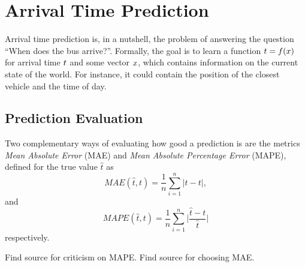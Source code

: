 \section{Arrival Time Prediction}
Arrival time prediction is, in a nutshell, the problem of answering
the question ``When does the bus arrive?''. Formally, the goal is to
learn a function $t = f(x)$ for arrival time $t$ and 
some vector $x$, which
contains information on the current state of the world. For instance, it
could contain the position of the closest vehicle and the time of day.

\subsection{Prediction Evaluation}
Two complementary ways of evaluating how good a prediction is are the metrics
\textit{Mean Absolute Error} (MAE) and \textit{Mean Absolute Percentage
  Error} (MAPE), defined for the true value $\hat{t}$ as 
\begin{equation}
  \label{eq:mae}
  MAE(\hat{t}, t) = \frac{1}{n}\sum_{i=1}^{n}{\vert \hat{t} - t \vert},
\end{equation}
and
\begin{equation}
  \label{eq:mape}
  MAPE(\hat{t}, t) = \frac{1}{n}\sum_{i=1}^{n} \vert \frac{\hat{t} - t}{\hat{t}} \vert
\end{equation}
respectively. 

Find source for criticism on MAPE. 
Find source for choosing MAE.

